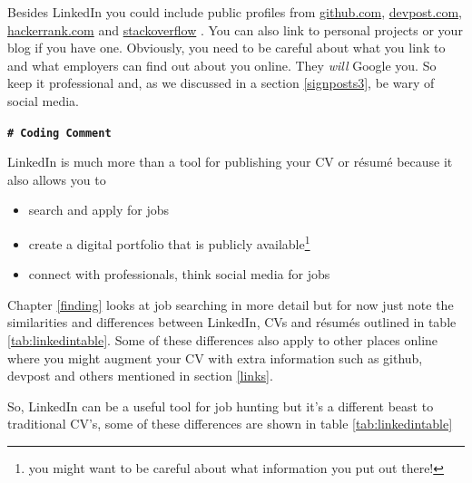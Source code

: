 \documentclass[
]{book}
\providecommand{\tightlist}{%
  \setlength{\itemsep}{0pt}\setlength{\parskip}{0pt}}
\begin{document}
Besides LinkedIn you could include public profiles from \href{https://docs.github.com/en/free-pro-team@latest/github/setting-up-and-managing-your-github-profile/about-your-profile}{github.com}, \href{https://help.devpost.com/hc/en-us/articles/360021734632-Update-your-profile-and-username}{devpost.com}, \href{https://www.hackerrank.com/leaderboard}{hackerrank.com} and \href{https://medium.com/@rhamedy/contribution-debt-why-how-to-contribute-to-stack-overflow-a69d4bd50d0c}{stackoverflow} \citep{stackoverflow}. You can also link to personal projects or your blog if you have one. Obviously, you need to be careful about what you link to and what employers can find out about you online. They \emph{will} Google you. So keep it professional and, as we discussed in a section \ref{signposts3}, be wary of social media.

\textbf{\texttt{\#\ Coding\ Comment}}

LinkedIn is much more than a tool for publishing your CV or résumé because it also allows you to

\begin{itemize}
\tightlist
\item
  search and apply for jobs
\item
  create a digital portfolio that is publicly available\footnote{you might want to be careful about what information you put out there!}
\item
  connect with professionals, think social media for jobs
\end{itemize}

Chapter \ref{finding} looks at job searching in more detail but for now just note the similarities and differences between LinkedIn, CVs and résumés outlined in table \ref{tab:linkedintable}. Some of these differences also apply to other places online where you might augment your CV with extra information such as github, devpost and others mentioned in section \ref{links}.

So, LinkedIn can be a useful tool for job hunting but it's a different beast to traditional CV's, some of these differences are shown in table \ref{tab:linkedintable}
\end{document}
